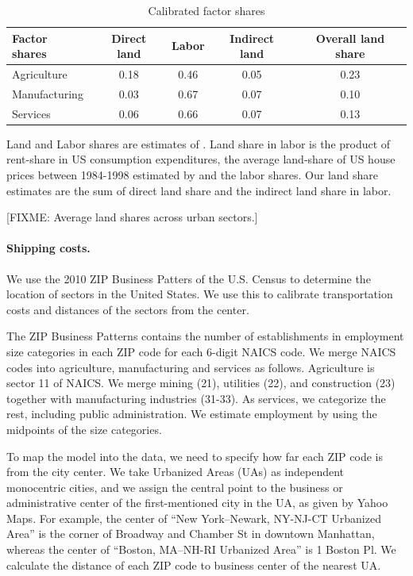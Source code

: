 \documentclass[12pt]{article}
\begin{document}
\begin{table}[h!]
\caption{Calibrated factor shares\label{tab:Sector_Shares}}
\begin{center}
\begin{tabular}{l|ccc|c}
\toprule
Factor shares & Direct land & Labor & Indirect land & Overall land share \\
\midrule
Agriculture & 0.18 & 0.46  & 0.05 & 0.23 \\
Manufacturing& 0.03 & 0.67 & 0.07 & 0.10  \\
Services    &  0.06 & 0.66 & 0.07 & 0.13 \\
\bottomrule
\end{tabular}
\end{center}

\noindent \footnotesize{Land and Labor shares are estimates of . Land share in labor is the product of rent-share in US consumption expenditures, the average land-share of US house prices between 1984-1998 estimated by  and the labor shares. Our land share estimates are the sum of direct land share and the indirect land share in labor.}
\end{table}

[FIXME: Average land shares across urban sectors.]

\paragraph{Shipping costs.}
We use the 2010 ZIP Business Patters of the U.S. Census \cite{CBP} to determine the location of sectors in the United States. We use this to calibrate transportation costs and distances of the sectors from the center.

The ZIP Business Patterns contains the number of establishments in employment size categories in each ZIP code for each 6-digit NAICS code. We merge NAICS codes into agriculture, manufacturing and services as follows. Agriculture is sector 11 of NAICS. We merge mining (21), utilities (22), and construction (23) together with manufacturing industries (31-33). As services, we categorize the rest, including public administration. We estimate employment by using the midpoints of the size categories.

To map the model into the data, we need to specify how far each ZIP code is from the city center. We take Urbanized Areas (UAs) as independent monocentric cities, and we assign the central point to the business or administrative center of the first-mentioned city in the UA, as given by Yahoo Maps. For example, the center of ``New York–Newark, NY-NJ-CT Urbanized Area'' is the corner of Broadway and Chamber St in downtown Manhattan, whereas the center of ``Boston, MA–NH-RI Urbanized Area'' is 1 Boston Pl. We calculate the distance of each ZIP code to business center of the nearest UA.
\end{document}
